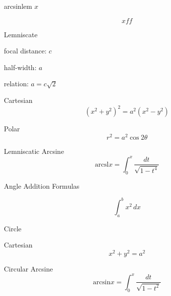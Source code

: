 \documentclass[17pt]{memoir}
\begin{document}
\def\sl{x}
arcsinlem $x$

\[
\sl{ff}
\]

Lemniscate

focal distance: $c$

half-width: $a$

relation:  $a = c \sqrt{2}$

Cartesian
\[
(x^2 + y^2)^2 = a^2(x^2 - y^2)
\]

Polar
\[
r^2 = a^2 \cos{2\theta}
\]

Lemniscatic Arcsine
\[
\text{arcsl} x = \int_{0}^{x} \frac{dt}{\sqrt{1-t^4}}
\]

Angle Addition Formulas

\[
\int_{a}^{b} x^2 \,dx
\]

\newpage

Circle

Cartesian
\[
x^2 + y^2 = a^2
\]

Circular Arcsine
\[
\text{arcsin} x = \int_{0}^{x} \frac{dt}{\sqrt{1-t^2}}
\]
\end{document}
